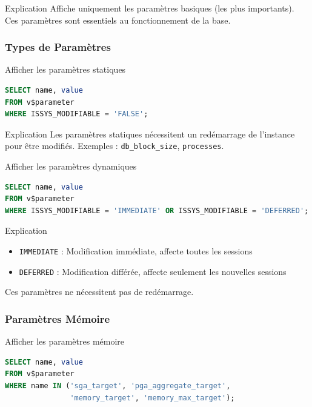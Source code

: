 \documentclass[12pt,a4paper]{article}
\begin{document}
\begin{explication}{Explication}
Affiche uniquement les paramètres basiques (les plus importants). Ces paramètres sont essentiels au fonctionnement de la base.
\end{explication}

\subsubsection{Types de Paramètres}

\begin{commande}{Afficher les paramètres statiques}
\begin{lstlisting}[language=SQL]
SELECT name, value
FROM v$parameter
WHERE ISSYS_MODIFIABLE = 'FALSE';
\end{lstlisting}
\end{commande}

\begin{explication}{Explication}
Les paramètres statiques nécessitent un redémarrage de l'instance pour être modifiés. Exemples : \texttt{db\_block\_size}, \texttt{processes}.
\end{explication}

\begin{commande}{Afficher les paramètres dynamiques}
\begin{lstlisting}[language=SQL]
SELECT name, value
FROM v$parameter
WHERE ISSYS_MODIFIABLE = 'IMMEDIATE' OR ISSYS_MODIFIABLE = 'DEFERRED';
\end{lstlisting}
\end{commande}

\begin{explication}{Explication}
\begin{itemize}
    \item \texttt{IMMEDIATE} : Modification immédiate, affecte toutes les sessions
    \item \texttt{DEFERRED} : Modification différée, affecte seulement les nouvelles sessions
\end{itemize}
Ces paramètres ne nécessitent pas de redémarrage.
\end{explication}

\subsubsection{Paramètres Mémoire}

\begin{commande}{Afficher les paramètres mémoire}
\begin{lstlisting}[language=SQL]
SELECT name, value 
FROM v$parameter 
WHERE name IN ('sga_target', 'pga_aggregate_target', 
               'memory_target', 'memory_max_target');
\end{lstlisting}
\end{commande}
\end{document}
